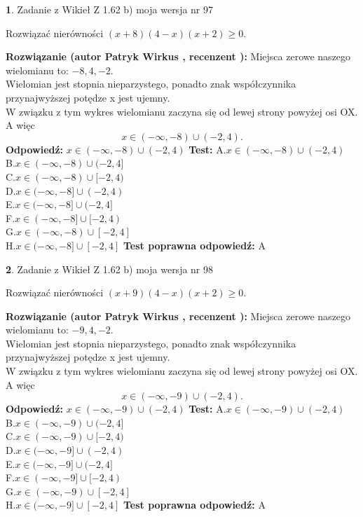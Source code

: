 \documentclass[12pt, a4paper]{article}
\theoremstyle{definition} %
\newtheorem{zad}{}
\newcommand{\zadStart}[1]{\begin{zad}#1\newline}
\newcommand{\zadStop}{\end{zad}}
\newcommand{\rozwStart}[2]{\noindent \textbf{Rozwiązanie (autor #1 , recenzent #2): }\newline}
\newcommand{\rozwStop}{\newline}
\newcommand{\odpStart}{\noindent \textbf{Odpowiedź:}\newline}
\newcommand{\odpStop}{\newline}
\newcommand{\testStart}{\noindent \textbf{Test:}\newline}
\newcommand{\testStop}{\newline}
\newcommand{\kluczStart}{\noindent \textbf{Test poprawna odpowiedź:}\newline}
\newcommand{\kluczStop}{\newline}
\begin{document}
\zadStart{Zadanie z Wikieł Z 1.62 b) moja wersja nr 97}

Rozwiązać nierówności $(x+8)(4-x)(x+2)\ge0$.
\zadStop
\rozwStart{Patryk Wirkus}{}
Miejsca zerowe naszego wielomianu to: $-8, 4, -2$.\\
Wielomian jest stopnia nieparzystego, ponadto znak współczynnika przy\linebreak najwyższej potędze x jest ujemny.\\ W związku z tym wykres wielomianu zaczyna się od lewej strony powyżej osi OX. A więc $$x \in (-\infty,-8) \cup (-2,4).$$
\rozwStop
\odpStart
$x \in (-\infty,-8) \cup (-2,4)$
\odpStop
\testStart
A.$x \in (-\infty,-8) \cup (-2,4)$\\
B.$x \in (-\infty,-8) \cup (-2,4]$\\
C.$x \in (-\infty,-8) \cup [-2,4)$\\
D.$x \in (-\infty,-8] \cup (-2,4)$\\
E.$x \in (-\infty,-8] \cup (-2,4]$\\
F.$x \in (-\infty,-8] \cup [-2,4)$\\
G.$x \in (-\infty,-8) \cup [-2,4]$\\
H.$x \in (-\infty,-8] \cup [-2,4]$
\testStop
\kluczStart
A
\kluczStop



\zadStart{Zadanie z Wikieł Z 1.62 b) moja wersja nr 98}

Rozwiązać nierówności $(x+9)(4-x)(x+2)\ge0$.
\zadStop
\rozwStart{Patryk Wirkus}{}
Miejsca zerowe naszego wielomianu to: $-9, 4, -2$.\\
Wielomian jest stopnia nieparzystego, ponadto znak współczynnika przy\linebreak najwyższej potędze x jest ujemny.\\ W związku z tym wykres wielomianu zaczyna się od lewej strony powyżej osi OX. A więc $$x \in (-\infty,-9) \cup (-2,4).$$
\rozwStop
\odpStart
$x \in (-\infty,-9) \cup (-2,4)$
\odpStop
\testStart
A.$x \in (-\infty,-9) \cup (-2,4)$\\
B.$x \in (-\infty,-9) \cup (-2,4]$\\
C.$x \in (-\infty,-9) \cup [-2,4)$\\
D.$x \in (-\infty,-9] \cup (-2,4)$\\
E.$x \in (-\infty,-9] \cup (-2,4]$\\
F.$x \in (-\infty,-9] \cup [-2,4)$\\
G.$x \in (-\infty,-9) \cup [-2,4]$\\
H.$x \in (-\infty,-9] \cup [-2,4]$
\testStop
\kluczStart
A
\kluczStop
\end{document}
